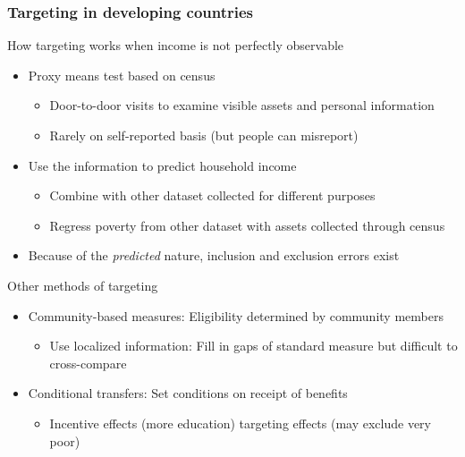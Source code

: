 \documentclass[aspectratio=169]{beamer}
\begin{document}
\begin{frame}
  \frametitle{Targeting in developing countries}
How targeting works when income is not perfectly observable
\begin{itemize}\setlength\itemsep{3pt}
\item Proxy means test based on census
\begin{itemize}\setlength\itemsep{3pt}
\item Door-to-door visits to examine visible assets and personal information
\item Rarely on self-reported basis (but people can misreport)
\end{itemize}
\item Use the information to predict household income
\begin{itemize}\setlength\itemsep{3pt}
\item Combine with other dataset collected for different purposes 
\item Regress poverty from other dataset with assets collected through census
\end{itemize}
\item Because of the \textit{predicted} nature, inclusion and exclusion errors exist
\end{itemize}\medskip
Other methods of targeting
\begin{itemize}\setlength\itemsep{3pt}
\item Community-based measures: Eligibility determined by community members
\begin{itemize}\setlength\itemsep{3pt}
\item Use localized information: Fill in gaps of standard measure but difficult to cross-compare
\end{itemize}
  \item Conditional transfers: Set conditions on receipt of benefits
  \begin{itemize}\setlength\itemsep{3pt}
\item Incentive effects (more education) targeting effects (may exclude very poor)
\end{itemize}
\end{itemize}
\end{frame}
\end{document}
